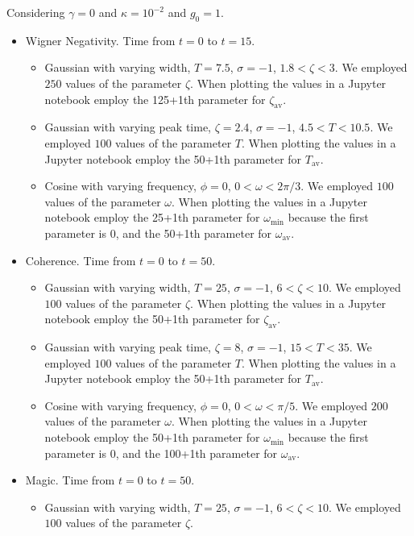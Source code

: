 \documentclass{article}
\begin{document}
Considering $\gamma=0$ and $\kappa=10^{-2}$ and $g_0=1$.

\begin{itemize}
    \item Wigner Negativity. Time from $t=0$ to $t=15$.
    \begin{itemize}
        \item Gaussian with varying width, $T=7.5$, $\sigma=-1$, $1.8<\zeta<3$. We employed $250$ values of the parameter $\zeta$.
        When plotting the values in a Jupyter notebook employ the 125+1th parameter for $\zeta_{\text{av}}$.
        \item Gaussian with varying peak time, $\zeta=2.4$, $\sigma=-1$, $4.5<T<10.5$. We employed $100$ values of the parameter $T$.
        When plotting the values in a Jupyter notebook employ the 50+1th parameter for $T_{\text{av}}$.
        \item Cosine with varying frequency, $\phi=0$, $0<\omega<2\pi/3$. We employed $100$ values of the parameter $\omega$.
        When plotting the values in a Jupyter notebook employ the 25+1th parameter for $\omega_{\text{min}}$ because the first parameter is $0$, and the 50+1th parameter for $\omega_{\text{av}}$.
    \end{itemize}
    \item Coherence. Time from $t=0$ to $t=50$.
    \begin{itemize}
        \item Gaussian with varying width, $T=25$, $\sigma=-1$, $6<\zeta<10$. We employed $100$ values of the parameter $\zeta$.
        When plotting the values in a Jupyter notebook employ the 50+1th parameter for $\zeta_{\text{av}}$.
        \item Gaussian with varying peak time, $\zeta=8$, $\sigma=-1$, $15<T<35$. We employed $100$ values of the parameter $T$.
        When plotting the values in a Jupyter notebook employ the 50+1th parameter for $T_{\text{av}}$.
        \item Cosine with varying frequency, $\phi=0$, $0<\omega<\pi/5$. We employed $200$ values of the parameter $\omega$.
        When plotting the values in a Jupyter notebook employ the 50+1th parameter for $\omega_{\text{min}}$ because the first parameter is $0$, and the 100+1th parameter for $\omega_{\text{av}}$.
    \end{itemize}
    \item Magic. Time from $t=0$ to $t=50$.
    \begin{itemize}
         \item Gaussian with varying width, $T=25$, $\sigma=-1$, $6<\zeta<10$. We employed $100$ values of the parameter $\zeta$.

\end{itemize}
\end{itemize}
\end{document}
